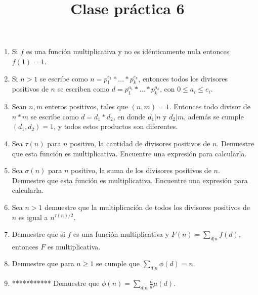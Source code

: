 \documentclass{article}
\title{Clase pr\'actica 6}
\begin{document}
\maketitle
\begin{enumerate}
    \item  Si $f$ es una función multiplicativa y no es idénticamente nula entonces $f(1) = 1$.
    \item Si $n>1$ se escribe como $n = p_1^{e_1} *...* p_k^{e_k}$, entonces todos los divisores positivos de $n$ se escriben como $d = p_1^{a_1} *...* p_k^{a_k}$, con $0 \leq a_i \leq e_i$.
    \item Sean $n,m$ enteros positivos, tales que $(n, m) = 1$. Entonces todo divisor de $n*m$ se escribe como $d = d_1 * d_2$, en donde $d_1 | n$ y $d_2 | m$, además se cumple $(d_1, d_2) = 1$, y todos estos productos son diferentes.
    \item Sea $\tau(n)$ para $n$ positivo, la cantidad de divisores positivos de $n$. Demuestre que esta función es multiplicativa. Encuentre una expresión para calcularla.
    \item Sea $\sigma(n)$ para $n$ positivo, la suma de los divisores positivos de $n$. Demuestre que esta función es multiplicativa. Encuentre una expresión para calcularla.
    \item Sea $n>1$ demuestre que la multiplicación de todos los divisores positivos de $n$ es igual a $n^{\tau(n)/2}$.
    \item Demuestre que si $f$ es una función multiplicativa y $F(n) = \sum_{d | n} f(d)$, entonces $F$ es multiplicativa.
    \item Demuestre que para $n \geq 1$ se cumple que $\sum_{d|n}\phi(d) = n$.
    \item *********** Demuestre que $\phi(n) =  \sum_{d|n} \frac{n}{d} \mu(d)$.
\end{enumerate}
\end{document}
